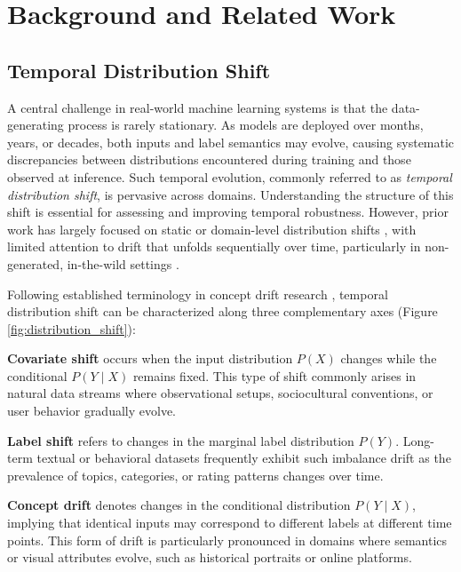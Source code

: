 \section{Background and Related Work}
\label{section_background}

\subsection{Temporal Distribution Shift}
A central challenge in real-world machine learning systems is that the data-generating process is rarely stationary. As models are deployed over months, years, or decades, both inputs and label semantics may evolve, causing systematic discrepancies between distributions encountered during training and those observed at inference. Such temporal evolution, commonly referred to as \emph{temporal distribution shift}, is pervasive across domains. Understanding the structure of this shift is essential for assessing and improving temporal robustness. However, prior work has largely focused on static or domain-level distribution shifts \cite{ben2010theory,gulrajani2021in_search_of_lost,koh2021wilds}, with limited attention to drift that unfolds sequentially over time, particularly in non-generated, in-the-wild settings \cite{yao2022wildtime}.

Following established terminology in concept drift research \cite{gama2014a_survey_on_concept_drift}, temporal distribution shift can be characterized along three complementary axes (Figure \ref{fig:distribution_shift}):

\textbf{Covariate shift} occurs when the input distribution $P(X)$ changes while the conditional $P(Y \mid X)$ remains fixed. This type of shift commonly arises in natural data streams where observational setups, sociocultural conventions, or user behavior gradually evolve.

\textbf{Label shift} refers to changes in the marginal label distribution $P(Y)$. Long-term textual or behavioral datasets frequently exhibit such imbalance drift as the prevalence of topics, categories, or rating patterns changes over time.

\textbf{Concept drift} denotes changes in the conditional distribution $P(Y \mid X)$, implying that identical inputs may correspond to different labels at different time points. This form of drift is particularly pronounced in domains where semantics or visual attributes evolve, such as historical portraits \cite{ginosar2015century} or online platforms.

